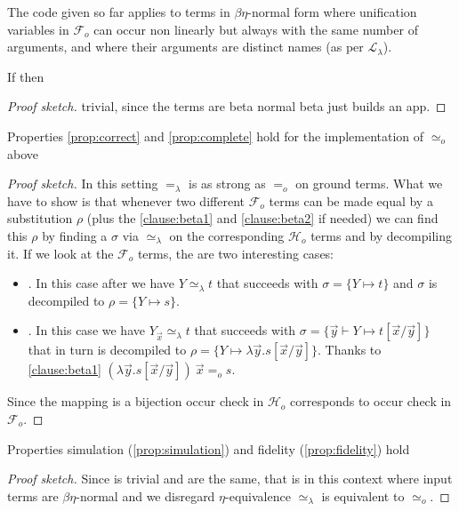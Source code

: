 \documentclass[sigconf,natbib=false,review]{acmart}
\newcommand{\EqualRel}{\ensuremath{=}}
\newcommand{\UnifRel}{\ensuremath{\simeq}}
\newcommand{\Uo}{\ensuremath{\UnifRel_o}\xspace}
\newcommand{\Eo}{\ensuremath{\EqualRel_o}\xspace}
\newcommand{\Ue}{\ensuremath{\UnifRel_\lambda}\xspace}
\newcommand{\Ee}{\ensuremath{\EqualRel_\lambda}\xspace}
\newcommand{\llambda}{\ensuremath{\mathcal{L}_\lambda}\xspace}
\newcommand{\Fo}{\ensuremath{\mathcal{F}_{\!o}\xspace}} %
\newcommand{\Ho}{\ensuremath{\mathcal{H}_o}\xspace}
\begin{document}


The code given so far applies to terms in $\beta\eta$-normal form where
unification variables in \Fo{} can occur non linearly but always with
the same number of arguments, and where their arguments are distinct names
(as per \llambda).

\begin{lemma} If
   then 
\end{lemma}
\begin{proof}[Proof sketch]
trivial, since the terms are beta normal beta just builds an app.
\end{proof}


\begin{lemma}
Properties \ref{prop:correct} and
\ref{prop:complete} hold for the implementation of \Uo above
\end{lemma}
\begin{proof}[Proof sketch]
 In this setting \Ee is as strong as
\Eo on ground terms. What we have to show is that whenever two different \Fo
terms can be made equal by a substitution $\rho$ (plus the \ref{clause:beta1}
and \ref{clause:beta2} if needed) we can find this $\rho$ by finding
a $\sigma$ via \Ue{} on the corresponding \Ho terms and by decompiling it.
If we look at the \Fo{} terms, the are two interesting cases:
\begin{itemize}
\item \elpiIn{fuva X ~\Uo~ s}. In this case after  we have
  $Y \Ue t$ that succeeds with $\sigma = \{ Y \mapsto t\}$ and
  $\sigma$ is decompiled to $\rho = \{ Y \mapsto s\}$.
\item \elpiIn{fall[fuva X|L] ~\Uo~ s}. In this case
 we have $Y_{\vec{x}} \Ue t$ that succeeds with
 $\sigma = \{ \vec{y} \vdash Y \mapsto t[\vec{x}/\vec{y}]\}$ that in turn
 is decompiled to $\rho = \{ Y \mapsto \lambda \vec{y}.s[\vec{x}/\vec{y}]\}$.
 Thanks to \ref{clause:beta1}
 $(\lambda \vec{y}.s[\vec{x}/\vec{y}])~\vec{x} \Eo s$.
\end{itemize}
Since the mapping is a bijection occur check in \Ho{} corresponds to occur
check in \Fo{}.
\end{proof}

\begin{lemma} Properties simulation (\ref{prop:simulation}) and
fidelity (\ref{prop:fidelity}) hold
\end{lemma}
\begin{proof}[Proof sketch]
Since  is trivial \fstep and \hstep are the same, that is
in this
context where input terms are $\beta\eta$-normal and we disregard $\eta$-equivalence
\Ue is equivalent to \Uo.
\end{proof}
\end{document}
